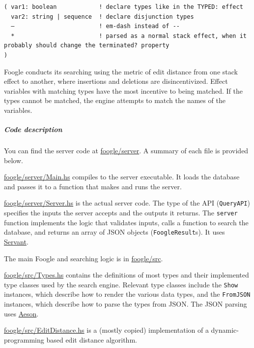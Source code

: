 \documentclass[
]{article}
\begin{document}
\begin{verbatim}
( var1: boolean            ! declare types like in the TYPED: effect
  var2: string | sequence  ! declare disjunction types
  —                        ! em-dash instead of --
  *                        ! parsed as a normal stack effect, when it probably should change the terminated? property
)
\end{verbatim}

Foogle conducts its searching using the metric of edit distance from one
stack effect to another, where insertions and deletions are
disincentivized. Effect variables with matching types have the most
incentive to being matched. If the types cannot be matched, the engine
attempts to match the names of the variables.

\hypertarget{code-description}{%
\subparagraph{Code description}\label{code-description}}

You can find the server code at
\href{https://github.com/factor-hmc/foogle/tree/master/server}{foogle/server}.
A summary of each file is provided below.

\href{https://github.com/factor-hmc/foogle/blob/master/server/Main.hs}{foogle/server/Main.hs}
compiles to the server executable. It loads the database and passes it
to a function that makes and runs the server.

\href{https://github.com/factor-hmc/foogle/blob/master/server/Server.hs}{foogle/server/Server.hs}
is the actual server code. The type of the API (\texttt{QueryAPI})
specifies the inputs the server accepts and the outputs it returns. The
\texttt{server} function implements the logic that validates inputs,
calls a function to search the database, and returns an array of JSON
objects (\texttt{FoogleResult}s). It uses
\href{https://www.servant.dev/}{Servant}.

The main Foogle and searching logic is in
\href{https://github.com/factor-hmc/foogle/tree/master/src}{foogle/src}.

\href{https://github.com/factor-hmc/foogle/blob/master/src/Types.hs}{foogle/src/Types.hs}
contains the definitions of most types and their implemented type
classes used by the search engine. Relevant type classes include the
\texttt{Show} instances, which describe how to render the various data
types, and the \texttt{FromJSON} instances, which describe how to parse
the types from JSON. The JSON parsing uses
\href{https://hackage.haskell.org/package/aeson}{Aeson}.

\href{https://github.com/factor-hmc/foogle/blob/master/src/EditDistance.hs}{foogle/src/EditDistance.hs}
is a (mostly copied) implementation of a dynamic-programming based edit
distance algorithm.
\end{document}
